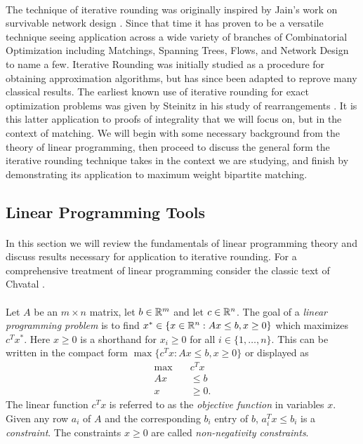 \paragraph{}
The technique of iterative rounding was originally inspired by Jain's work on survivable network design \cite{jain2001factor}. Since that time it has proven to be a versatile technique seeing application across a wide variety of branches of Combinatorial Optimization including Matchings, Spanning Trees, Flows, and Network Design \cite{lau2011iterative} to name a few. Iterative Rounding was initially studied as a procedure for obtaining approximation algorithms, but has since been adapted to reprove many classical results. The earliest known use of iterative rounding for exact optimization problems was given by Steinitz in his study of rearrangements \cite{steinitz1913bedingt}. It is this latter application to proofs of integrality that we will focus on, but in the context of matching. We will begin with some necessary background from the theory of linear programming, then proceed to discuss the general form the iterative rounding technique takes in the context we are studying, and finish by demonstrating its application to maximum weight bipartite matching.
\subsection{Linear Programming Tools}\label{IR:LP}
\paragraph{}
In this section we will review the fundamentals of linear programming theory and discuss results necessary for application to iterative rounding. For a comprehensive treatment of linear programming consider the classic text of Chvatal \cite{chvatal1983linear}.

\paragraph{} Let $A$ be an $m \times n$ matrix, let $b \in \mathbb{R}^m$ and let $c \in \mathbb{R}^n$. The goal of a {\it linear programming problem} is to find $x^* \in \{x \in \mathbb{R}^n : Ax \leq b, x \geq 0 \}$ which maximizes $c^Tx^*$. Here $x \geq 0$ is a shorthand for $x_i \geq 0$ for all $i \in \{1, \dots, n\}$. This can be written in the compact form $\max\{c^Tx : Ax \leq b, x \geq 0 \}$ or displayed as
\begin{align}
\max\quad &c^Tx\nonumber \\
Ax &\leq b \label{LP:standard}\\
x &\geq 0.\nonumber
\end{align}
The linear function $c^Tx$ is referred to as the {\it objective function} in variables $x$. Given any row $a_i$ of $A$ and the corresponding $b_i$ entry of $b$, $a_i^Tx \leq b_i$ is a {\it constraint}. The constraints $x \geq 0$ are called {\it non-negativity constraints}. 

